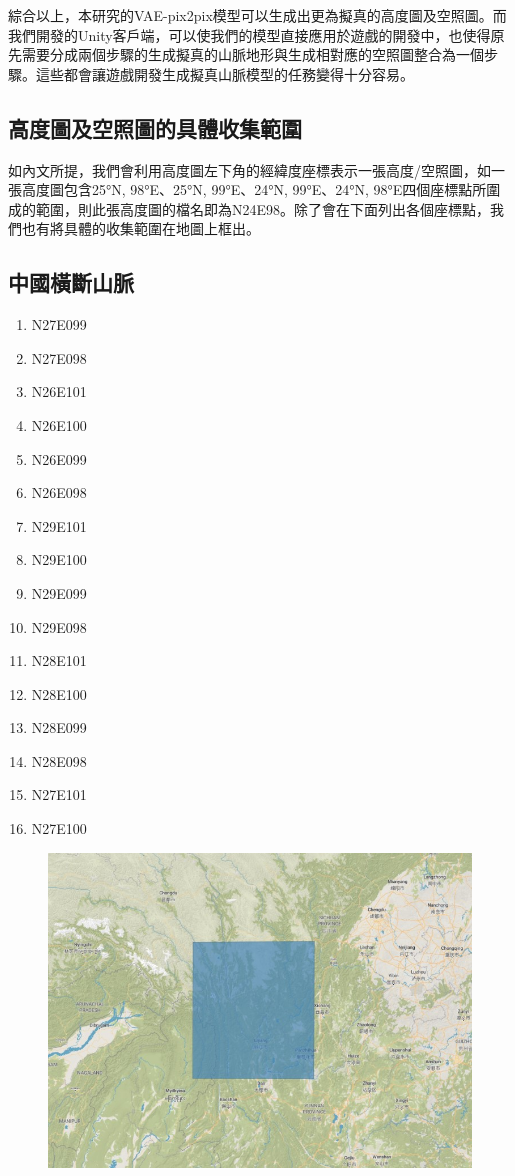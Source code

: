 \documentclass[a4paper, 12pt]{article}
\begin{document}
綜合以上，本研究的VAE-pix2pix模型可以生成出更為擬真的高度圖及空照圖。而我們開發的Unity客戶端，可以使我們的模型直接應用於遊戲的開發中，也使得原先需要分成兩個步驟的生成擬真的山脈地形與生成相對應的空照圖整合為一個步驟。這些都會讓遊戲開發生成擬真山脈模型的任務變得十分容易。

\nocite{*}
\printbibliography[title={參考文獻}]

\newpage
\appendixpage
\begin{appendices}
\section{高度圖及空照圖的具體收集範圍}
如內文所提，我們會利用高度圖左下角的經緯度座標表示一張高度/空照圖，如一張高度圖包含25°N, 98°E、25°N, 99°E、24°N, 99°E、24°N, 98°E四個座標點所圍成的範圍，則此張高度圖的檔名即為N24E98。除了會在下面列出各個座標點，我們也有將具體的收集範圍在地圖上框出。

\subsection{中國橫斷山脈}
\begin{multicols}{3}
\begin{enumerate}
    \item N27E099
    \item N27E098
    \item N26E101
    \item N26E100
    \item N26E099
    \item N26E098
    \item N29E101
    \item N29E100
    \item N29E099
    \item N29E098
    \item N28E101
    \item N28E100
    \item N28E099
    \item N28E098
    \item N27E101
    \item N27E100
\end{enumerate}
\end{multicols}
\begin{figure}[H]
    \centering
    \includegraphics[width=0.8\linewidth]{fig/a1.jpg}
\end{figure}

\end{appendices}
\end{document}
